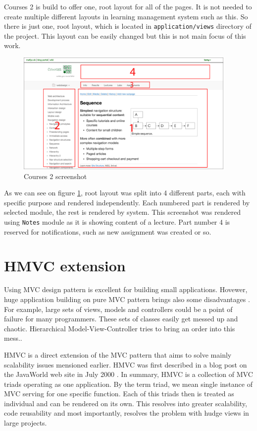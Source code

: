 Courses 2 is build to offer one, root layout for all of the pages. It is not needed to create multiple different layouts in learning management system such as this. So there is just one, root layout, which is located in \texttt{application/views} directory of the project. This layout can be easily changed but this is not main focus of this work.

\begin{figure}[h]
    \centering
    \includegraphics[width=0.95\textwidth]{images/courses-labelled.png}
    \caption{Courses 2 screenshot}
    \label{courses2screen}
\end{figure}


As we can see on figure \ref{courses2screen}, root layout was split into 4 different parts, each with specific purpose and rendered independently. Each numbered part is rendered by selected module, the rest is rendered by system. This screenshot was rendered using \texttt{Notes} module as it is showing content of a lecture. Part number 4 is reserved for notifications, such as new assignment was created or so.

\section{HMVC extension}
Using MVC design pattern is excellent for building small applications. Hovewer, huge application building on pure MVC pattern brings also some disadvantages \cite{culik}. For example, large sets of views, models and controllers could be a point of failure for many programmers. These sets of classes easily get messed up and chaotic. Hierarchical Model-View-Controller tries to bring an order into this mess.\cite{hmvc}.

HMVC is a direct extension of the MVC pattern that aims to solve mainly scalability issues mensioned earlier. HMVC was first described in a blog post on the JavaWorld web site in July 2000 \cite{hmvc}. In summary, HMVC is a collection of MVC triads operating as one application. By the term triad, we mean single instance of MVC serving for one specific function. Each of this triads then is treated as individual and can be rendered on its own. This resolves into greater scalability, code reusability and most importantly, resolves the problem with hudge views in large projects.

